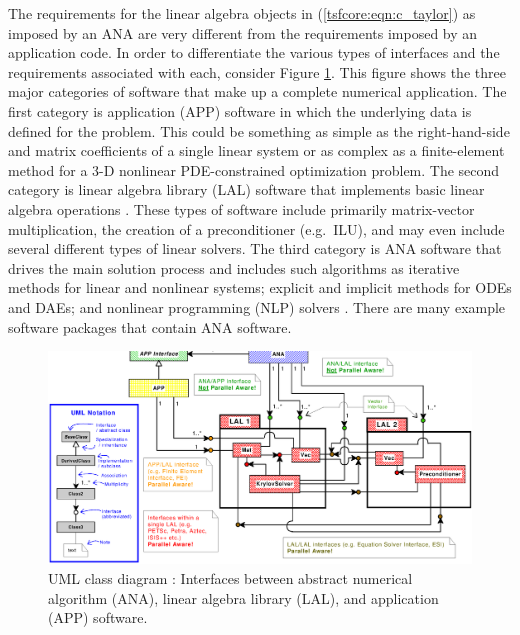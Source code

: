 \documentclass[10pt,fleqn]{article}
\begin{document}
The requirements for the linear algebra objects in
(\ref{tsfcore:eqn:c_taylor}) as imposed by
an ANA are very different from the requirements imposed by an
application code.  In order to differentiate the various types of
interfaces and the requirements associated with each, consider Figure
\ref{tsfcore:fig:ANA_LAL_APP}.  This figure shows the three major
categories of software that make up a complete numerical application.
The first category is application (APP) software in which the
underlying data is defined for the problem.  This could be something
as simple as the right-hand-side and matrix coefficients of a single
linear system or as complex as a finite-element method for a 3-D
nonlinear PDE-constrained optimization problem.  The second category
is linear algebra library (LAL) software that implements basic linear
algebra operations \cite{ref:demmel_1997,ref:anderson_1995,
ref:blackford_et_al_1997, ref:aztec, ref:petsc, ref:trilinos}. These
types of software include primarily matrix-vector multiplication, the
creation of a preconditioner (e.g.~ILU), and may even include several
different types of linear solvers.  The third category is ANA software
that drives the main solution process and includes such algorithms as
iterative methods for linear and nonlinear systems; explicit and
implicit methods for ODEs and DAEs; and nonlinear programming (NLP)
solvers \cite{ref:nocedal_wright_1999}.  There are many example
software packages
\cite{ref:petsc,ref:aztec,ref:trilinos,ref:pvode,ref:tao} that contain
ANA software.

{\bsinglespace
\begin{figure}[t]
\begin{center}
\includegraphics*[bb= 0.245in 2.95in 10.85in 8.60in,angle=0,scale=0.50
]{analal}
\end{center}
\caption{
\label{tsfcore:fig:ANA_LAL_APP}
UML \cite{ref:booch_et_al_1999} class diagram : Interfaces between abstract numerical algorithm
(ANA), linear algebra library (LAL), and application (APP) software.
}
\end{figure}
\esinglespace}
\end{document}
